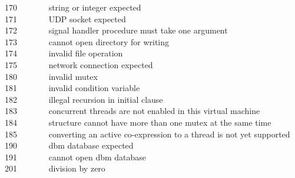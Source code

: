 170 \ \ \ \ \ \ \ string or integer expected\\
171 \ \ \ \ \ \ \ UDP socket expected\\
172 \ \ \ \ \ \ \ signal handler procedure must take one argument\\
173 \ \ \ \ \ \ \ cannot open directory for writing\\
174 \ \ \ \ \ \ \ invalid file operation\\
175 \ \ \ \ \ \ \ network connection expected\\
180 \ \ \ \ \ \ \ invalid mutex\\
181 \ \ \ \ \ \ \ invalid condition variable\\
182 \ \ \ \ \ \ \ illegal recursion in initial clause\\
183 \ \ \ \ \ \ \ concurrent threads are not enabled in
this virtual machine\\
184 \ \ \ \ \ \ \ structure cannot have more than one mutex at 
the same time\\
185 \ \ \ \ \ \ \ converting an active co-expression to a thread
is not yet supported\\
190 \ \ \ \ \ \ \ dbm database expected\\
191 \ \ \ \ \ \ \ cannot open dbm database\\
201 \ \ \ \ \ \ \ division by zero\\
